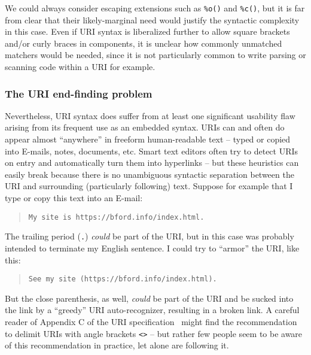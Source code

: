 We could always consider escaping extensions
such as \verb|%o()| and \verb|%c()|,
but it is far from clear that their likely-marginal need
would justify the syntactic complexity in this case.
Even if URI syntax is liberalized further to allow
square brackets and/or curly braces in components,
it is unclear how commonly unmatched matchers would be needed,
since it is not particularly common to write parsing or scanning code
within a URI for example.


\subsubsection{The URI end-finding problem}
\label{sec:embed:uri:end}

Nevertheless, 
URI syntax does suffer from at least one significant usability flaw
arising from its frequent use as an embedded syntax.
URIs can and often do appear almost ``anywhere''
in freeform human-readable text --
\eg typed or copied into E-mails, notes, documents, etc.
Smart text editors often try to detect URIs on entry
and automatically turn them into hyperlinks --
but these heuristics can easily break because
there is no unambiguous syntactic separation between the URI
and surrounding (particularly following) text.
Suppose for example that I type or copy this text into an E-mail:

\begin{footnotesize}
\begin{quote}
\verb|My site is https://bford.info/index.html.|
\end{quote}
\end{footnotesize}

The trailing period (\verb|.|) \emph{could} be part of the URI,
but in this case was probably intended to terminate my English sentence.
I could try to ``armor'' the URI, like this:

\begin{footnotesize}
\begin{quote}
\verb|See my site (https://bford.info/index.html).|
\end{quote}
\end{footnotesize}

But the close parenthesis, as well, \emph{could} be part of the URI
and be sucked into the link by a ``greedy'' URI auto-recognizer,
resulting in a broken link.
A careful reader of Appendix C of the URI specification~\cite{rfc3986}
might find the recommendation to delimit URIs
with angle brackets \verb|<>| --
but rather few people seem to be aware of this recommendation in practice,
let alone are following it.


